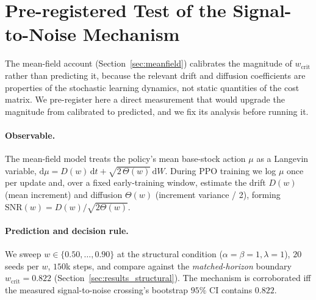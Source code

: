 \documentclass[letterpaper]{article}
\theoremstyle{plain}
\newcommand{\wcrit}{w_{\mathrm{crit}}}
\begin{document}
\section{Pre-registered Test of the Signal-to-Noise Mechanism}
\label{sec:appendix_snr}

The mean-field account (Section~\ref{sec:meanfield}) calibrates the magnitude of
$\wcrit$ rather than predicting it, because the relevant drift and diffusion
coefficients are properties of the stochastic learning dynamics, not static
quantities of the cost matrix. We pre-register here a direct measurement that
would upgrade the magnitude from calibrated to predicted, and we fix its
analysis before running it.

\paragraph{Observable.} The mean-field model treats the policy's mean
base-stock action $\mu$ as a Langevin variable,
$\mathrm{d}\mu = D(w)\,\mathrm{d}t + \sqrt{2\,\Theta(w)}\,\mathrm{d}W$. During
PPO training we log $\mu$ once per update and, over a fixed early-training
window, estimate the drift $D(w)$ (mean increment) and diffusion $\Theta(w)$
(increment variance / 2), forming $\mathrm{SNR}(w)=D(w)/\sqrt{2\Theta(w)}$.

\paragraph{Prediction and decision rule.} We sweep
$w\in\{0.50,\dots,0.90\}$ at the structural condition
($\alpha{=}\beta{=}1,\lambda{=}1$), $20$ seeds per $w$, $150$k steps, and
compare against the \emph{matched-horizon} boundary $\wcrit=0.822$
(Section~\ref{sec:results_structural}). The mechanism is corroborated iff the
measured signal-to-noise crossing's bootstrap $95\%$ CI contains $0.822$.
\end{document}
